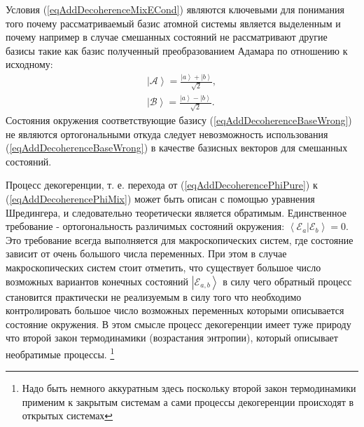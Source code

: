 Условия (\ref{eqAddDecoherenceMixECond}) являются ключевыми для
понимания того почему рассматриваемый базис атомной системы является
выделенным и почему например в случае смешанных состояний не
рассматривают другие базисы такие как базис полученный преобразованием
Адамара по отношению к исходному:
\begin{eqnarray}
\left|\mathcal{A}\right> = \frac{\left|a\right> + \left|b\right>}
              {\sqrt{2}},
\nonumber \\
\left|\mathcal{B}\right> = \frac{\left|a\right> - \left|b\right>}
              {\sqrt{2}}.
\label{eqAddDecoherenceBaseWrong}
\end{eqnarray}
Состояния окружения соответствующие базису
(\ref{eqAddDecoherenceBaseWrong}) не являются ортогональными откуда
следует невозможность использования (\ref{eqAddDecoherenceBaseWrong})
в качестве базисных векторов для смешанных состояний. 

Процесс декогеренции, т. е. перехода от
(\ref{eqAddDecoherencePhiPure}) к (\ref{eqAddDecoherencePhiMix}) может
быть описан с помощью уравнения Шредингера, и следовательно
теоретически является обратимым. Единственное требование -
ортогональность различимых состояний окружения: 
$\left<\mathcal{E}_a\right.\left|\mathcal{E}_b\right> = 0$. Это
требование всегда выполняется для макроскопических систем, где
состояние зависит от очень большого числа переменных. При этом в
случае макроскопических систем стоит отметить, что существует большое
число возможных вариантов конечных состояний
$\left|\mathcal{E}_{a,b}\right>$ 
в силу чего обратный процесс становится практически не реализуемым в
силу того что необходимо контролировать большое число возможных
переменных которыми описывается состояние окружения. В этом смысле
процесс декогеренции имеет туже природу что второй закон термодинамики 
(возрастания энтропии), который описывает
необратимые процессы.
\footnote{Надо быть немного аккуратным здесь
  поскольку второй закон термодинамики применим к закрытым системам а
  сами процессы декогеренции происходят в открытых системах}


